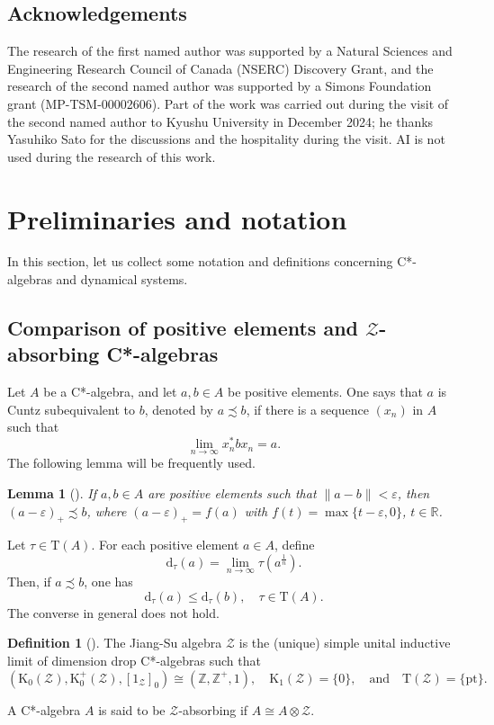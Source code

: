 \documentclass[12pt, oneside, psamsfonts]{amsart}
\newtheorem{lem}[thm]{Lemma}
\theoremstyle{definition}
\newtheorem{defn}[thm]{Definition}
\theoremstyle{remark}
\numberwithin{equation}{section}
\newcommand{\norm}[1]{\| #1\|}
\newcommand{\Real}{\mathbb R}
\newcommand{\Int}{\mathbb Z}
\newcommand{\eps}{\varepsilon}
\newcommand{\Kzero}{\textrm{K}_0}
\newcommand{\Kone}{\textrm{K}_1}
\newcommand{\tr}{\mathrm{T}}
\begin{document}
\subsection*{Acknowledgements} The research of the first named author was supported by a Natural Sciences and Engineering Research Council of Canada (NSERC) Discovery Grant, and the research of the second named author was supported by a Simons Foundation grant  (MP-TSM-00002606). Part of the work was carried out during the visit of the second named author to Kyushu University in December 2024; he  thanks Yasuhiko Sato for the discussions and the hospitality during the visit. AI is not used during the research of this work.

\section{Preliminaries and notation}

In this section, let us collect some notation and definitions concerning C*-algebras and dynamical systems.


\subsection{Comparison of positive elements and $\mathcal Z$-absorbing C*-algebras}

Let $A$ be a C*-algebra, and let $a, b \in A$ be positive elements. One says that $a$ is Cuntz subequivalent to $b$, denoted by $a \precsim b$, if there is a sequence $(x_n)$ in $A$ such that
$$ \lim_{n \to \infty} x_n^*b x_n = a.$$
The following lemma will be frequently used.
\begin{lem}[\cite{RorUHF2}]
If $a, b\in A$ are positive elements such that $\norm{a - b} < \eps$, then $(a-\eps)_+ \precsim b$, where $(a-\eps)_+ = f(a)$ with $f(t) = \max\{t-\eps, 0\}$, $t \in \Real$.
\end{lem}


Let $\tau \in \tr(A)$. For each positive element $a \in A$, define
$$\mathrm{d}_\tau(a) = \lim_{n\to\infty} \tau(a^{\frac{1}{n}}).$$
Then, if $a \precsim b$, one has $$\mathrm{d}_\tau(a) \leq \mathrm{d}_\tau(b),\quad \tau \in \tr(A).$$ The converse in general does not hold. 

\begin{defn}[\cite{JS-Z}]
The Jiang-Su algebra $\mathcal Z$ is the (unique) simple unital inductive limit of dimension drop C*-algebras such that $$(\Kzero(\mathcal Z), \Kzero^+(\mathcal Z), [1_\mathcal Z]_0) \cong (\Int, \Int^+, 1),\quad  \Kone(\mathcal Z) = \{0\},\quad \mathrm{and} \quad \tr(\mathcal Z) = \{\mathrm{pt}\}.$$ 

A C*-algebra $A$ is said to be $\mathcal Z$-absorbing if $A \cong A \otimes \mathcal Z$.
\end{defn}
\end{document}
